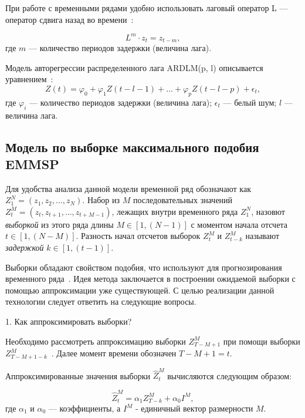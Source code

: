 При работе с временными рядами удобно использовать лаговый оператор L --– оператор сдвига назад во времени~\cite{poliref8}:

\begin{equation}
   L^m \cdot z_t = z_{t-m},
\end{equation}
где $m$ --- количество периодов задержки (величина лага).

Модель авторегрессии распределенного лага ARDLM(p, l) описывается уравнением~\cite{poliref8}:
\begin{equation}
    Z(t) = \varphi_0+\varphi_1Z(t-l-1)+\ldots+\varphi_pZ(t-l-p)+\epsilon_t,
\end{equation}
где $\varphi_i$ --- количество периодов задержки (величина лага);
$\epsilon_t$ --- белый шум;
$l$ --- величина лага.

\subsection{Модель по выборке максимального подобия EMMSP}

Для удобства анализа данной модели временной ряд обозначают как $Z_1^N=(z_1,z_2,\ldots,z_N)$.
Набор из $M$ последовательных значений \newline $Z_t^M=(z_t,z_{t+1},\ldots,z_{t+M-1})$, лежащих внутри временного ряда $Z_1^N$,
назовют \textit{выборкой} из этого ряда длины $M\in[1,(N-1)]$ с моментом начала отсчета $t\in[1,(N-M)]$.
Разность начал отсчетов выборок $Z_t^M$ и $Z_{t-k}^M$ называют \textit{задержкой} $k\in[1,(t-1)]$.

Выборки обладают свойством подобия, что используют для прогнозирования временного ряда~\cite{myref9}.
Идея метода заключается в построении ожидаемой выборки с помощью аппроксимации уже существующей.
С целью реализации данной технологии следует ответить на следующие вопросы.

1. Как аппроксимировать выборки?

Необходимо рассмотреть аппроксимацию выборки \newline $Z_{T-M+1}^M$ при помощи выборки $Z_{T-M+1-k}^M$~\cite{myref9}.
Далее момент времени обозначен $T-M+1=t$.

Аппроксимированные значения выборки $\widehat{Z}_t^M$ вычисляются следующим образом:

\begin{equation}
    \widehat{Z}_t^M = \alpha_1Z_{T-k}^M+\alpha_0I^M,
\end{equation}
где $\alpha_1$ и $\alpha_0$ --- коэффициенты,
а $I^M$ - единичный вектор размерности $M$.

